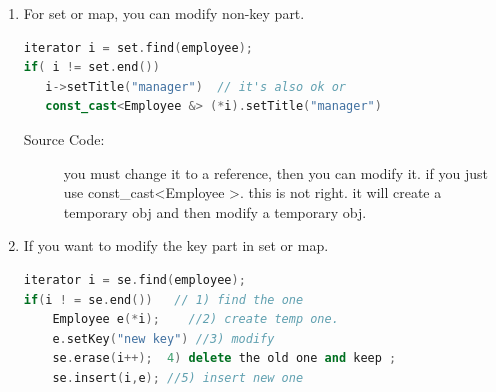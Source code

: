 \documentclass[a4paper,11pt,twoside]{book}
\begin{document}
\begin{itemize}
\begin{enumerate}
   \item For set or map, you can modify non-key part.
\begin{lstlisting}[frame=single, language=c++]
iterator i = set.find(employee);
if( i != set.end())
   i->setTitle("manager")  // it's also ok or
   const_cast<Employee &> (*i).setTitle("manager")
\end{lstlisting}
\begin{description}
	\item[Source Code:]  you must change it to a reference, then you can modify it. if you just use const\_cast<Employee >. this is not right. it will create a temporary obj and then modify a temporary obj.
\end{description}

\item If you want to modify the key part in set or map.
\begin{lstlisting}[frame=single, language=c++]
iterator i = se.find(employee); 
if(i ! = se.end())   // 1) find the one
	Employee e(*i);    //2) create temp one.
	e.setKey("new key") //3) modify
	se.erase(i++);  4) delete the old one and keep ;
	se.insert(i,e); //5) insert new one
\end{lstlisting}
 \end{enumerate}


\end{itemize}
\end{document}
